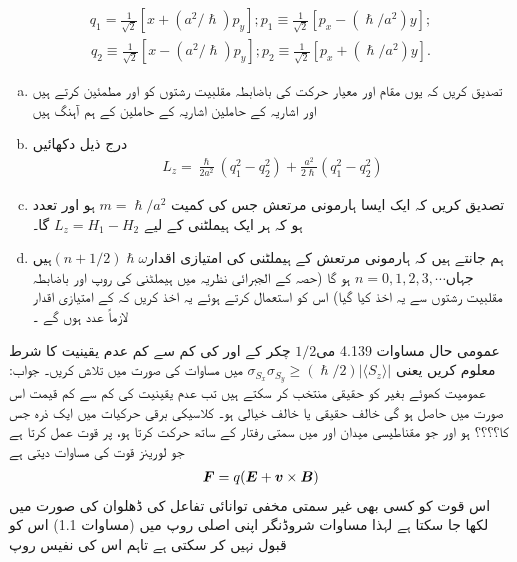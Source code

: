 \begin{align*}
    q_1=\frac{1}{\sqrt{2}}[x+(a^2/\hslash)p_y] ; p_1\equiv\frac{1}{\sqrt{2}}[p_x-(\hslash/a^2)y];
\end{align*}
\begin{align*}
    q_2\equiv\frac{1}{\sqrt{2}}[x-(a^2/\hslash)p_y];p_2\equiv\frac{1}{\sqrt{2}}[p_x+(\hslash/a^2)y].
\end{align*}
\begin{enumerate}[a.]
\item  تصدیق کریں کہ  یوں مقام اور معیار حرکت کی باضابطہ مقلبیت  رشتوں کو   اور   مطمئین کرتے ہیں اور اشاریہ   کے حاملین اشاریہ  کے حاملین کے ہم آہنگ ہیں 
\item  درج ذیل دکھائیں 
\begin{align*}
    L_z=\frac{\hslash}{2a^2}(q_1^2-q_2^2)+\frac{a^2}{2\hslash}(q_1^2-q_2^2)
\end{align*}
\item تصدیق کریں کہ ایک ایسا ہارمونی مرتعش جس کی کمیت  
\(m=\hslash/a^2\) 
ہو اور تعدد   ہو کہ ہر ایک ہیملٹنی  کے لیے \(L_z=H_1-H_2\) گا۔ 
\item ہم جانتے ہیں کہ ہارمونی مرتعش کے ہیملٹنی کی   امتیازی اقدار\((n+1/2)\hslash\omega\)ہیں جہاں\(n=0,1,2,3,\cdots\) ہو گا (حصہ  کے الجبرائی نظریہ میں ہیملٹنی کی روپ اور باضابطہ  مقلبیت رشتوں سے یہ اخذ کیا گیا) اس کو استعمال کرتے ہوئے یہ اخذ کریں کہ  کے امتیازی اقدار لازماً عدد ہوں گے ۔
\end{enumerate}
عمومی حال مساوات 4.139 می\(1/2\) چکر کے  اور  کی کم سے کم عدم یقینیت کا شرط معلوم کریں یعنی \(\sigma_{S_{x}}\sigma_{S_{y}}\geq(\hslash/2)|\langle S_z\rangle|\) میں مساوات کی صورت میں تلاش کریں۔ جواب: عمومیت کھوئے بغیر  کو حقیقی منتخب کر سکتے ہیں تب عدم یقینیت کی کم سے کم قیمت اس صورت میں حاصل ہو گی  خالف حقیقی یا خالف خیالی ہو۔
کلاسیکی برقی حرکیات میں ایک ذرہ جس کا؟؟؟؟  ہو اور جو مقناطیسی میدان  اور   میں سمتی رفتار   کے ساتھ حرکت کرتا ہو، پر قوت عمل کرتا ہے جو لورینز قوت کی مساوات دیتی ہے \begin{align}
    {\ensuremath{{\boldsymbol{F}}}}=q({{\boldsymbol{E}}}+{{\boldsymbol{v}}}\times{\ensuremath{{\boldsymbol{B}}}})
\end{align}
اس قوت کو کسی بھی غیر سمتی مخفی توانائی تفاعل کی ڈھلوان کی صورت میں لکھا جا سکتا ہے لہذا مساوات شروڈنگر اپنی اصلی روپ میں (مساوات 1.1) اس کو قبول نہیں کر سکتی ہے تاہم اس کی نفیس روپ 
